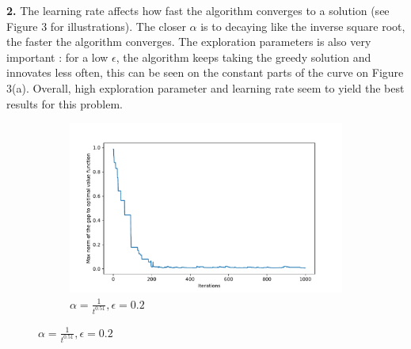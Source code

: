 \documentclass[11pt, oneside]{article}   	%
\begin{document}
\textbf{2.} The learning rate affects how fast the algorithm converges to a solution (see Figure 3 for illustrations). The closer $\alpha$ is to decaying like the inverse square root, the faster the algorithm converges. The exploration parameters is also very important : for a low $\epsilon$, the algorithm keeps taking the greedy solution and innovates less often, this can be seen on the constant parts of the curve on Figure 3(a). 
Overall, high exploration parameter and learning rate seem to yield the best results for this problem.
\begin{figure}
\centering
\begin{subfigure}{.5\textwidth}
  \centering
  \includegraphics[width=\linewidth]{q_learninge02}
  \caption{$\alpha = \frac{1}{t^{0.51}}, \epsilon = 0.2$}
\end{subfigure}


\end{figure}
\end{document}
